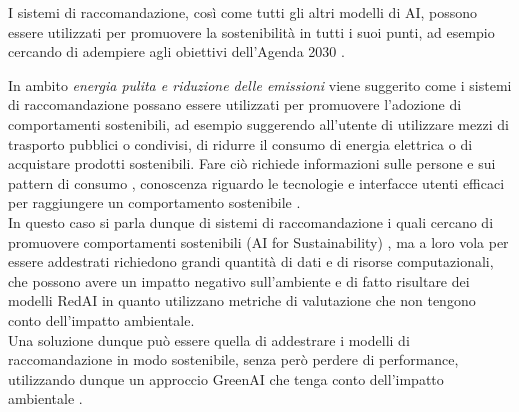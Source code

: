 I sistemi di raccomandazione, così come tutti gli altri modelli di AI, possono essere utilizzati per promuovere la sostenibilità in tutti i suoi punti, ad esempio cercando di adempiere agli obiettivi dell'Agenda 2030 \cite{RecommenderSustainability}.

\noindent In ambito \textit{energia pulita e riduzione delle emissioni} viene suggerito come i sistemi di raccomandazione possano essere utilizzati per promuovere l'adozione di comportamenti sostenibili, ad esempio suggerendo all'utente di utilizzare mezzi di trasporto pubblici o condivisi, di ridurre il consumo di energia elettrica o di acquistare prodotti sostenibili\cite{SuggerimentiResponsabili}. Fare ciò richiede informazioni sulle persone e sui pattern di consumo \cite{DatiConsumo}, conoscenza riguardo le tecnologie \cite{DatiTecnologia} e interfacce utenti efficaci per raggiungere un comportamento sostenibile \cite{Interfacce}.\\ In questo caso si parla dunque di sistemi di raccomandazione i quali cercano di promuovere comportamenti sostenibili (AI for Sustainability) \cite{sostenibilitaAI}, ma a loro vola per essere addestrati richiedono grandi quantità di dati e di risorse computazionali, che possono avere un impatto negativo sull'ambiente e di fatto risultare dei modelli RedAI \cite{GreenAI} in quanto utilizzano metriche di valutazione che non tengono conto dell'impatto ambientale\cite{MetricheNonSostenibili}.\\

\noindent Una soluzione dunque può essere quella di addestrare i modelli di raccomandazione in modo sostenibile, senza però perdere di performance, utilizzando dunque un approccio GreenAI \cite{GreenAI} che tenga conto dell'impatto ambientale \cite{spillo2023towards}.

